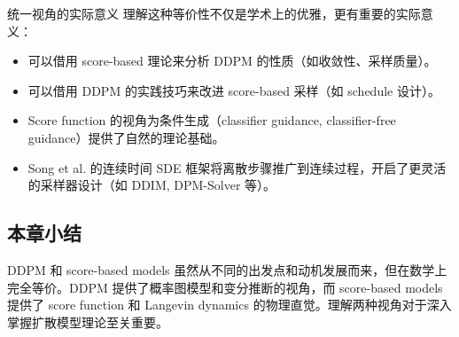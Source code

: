 \begin{importantbox}{统一视角的实际意义}
理解这种等价性不仅是学术上的优雅，更有重要的实际意义：
\begin{itemize}
    \item 可以借用 score-based 理论来分析 DDPM 的性质（如收敛性、采样质量）。
    \item 可以借用 DDPM 的实践技巧来改进 score-based 采样（如 schedule 设计）。
    \item Score function 的视角为条件生成（classifier guidance, classifier-free guidance）提供了自然的理论基础。
    \item Song et al. 的连续时间 SDE 框架将离散步骤推广到连续过程，开启了更灵活的采样器设计（如 DDIM, DPM-Solver 等）。
\end{itemize}
\end{importantbox}

\subsection{本章小结}

DDPM 和 score-based models 虽然从不同的出发点和动机发展而来，但在数学上完全等价。DDPM 提供了概率图模型和变分推断的视角，而 score-based models 提供了 score function 和 Langevin dynamics 的物理直觉。理解两种视角对于深入掌握扩散模型理论至关重要。

